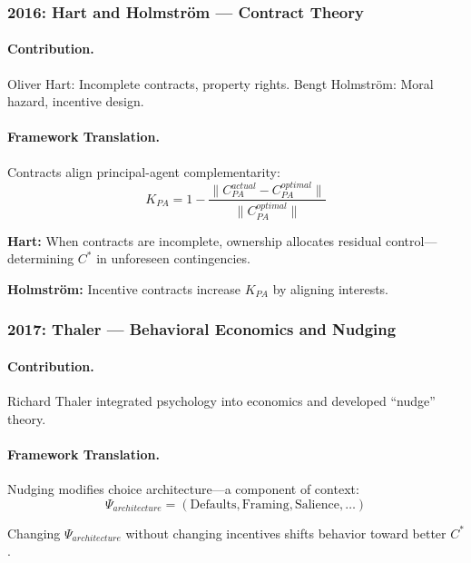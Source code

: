\subsubsection{2016: Hart and Holmström --- Contract Theory}

\paragraph{Contribution.}
Oliver Hart: Incomplete contracts, property rights.
Bengt Holmström: Moral hazard, incentive design.

\paragraph{Framework Translation.}
Contracts align principal-agent complementarity:
\begin{equation}
  K_{PA} = 1 - \frac{\|C_{PA}^{actual} - C_{PA}^{optimal}\|}{\|C_{PA}^{optimal}\|}
\end{equation}

\textbf{Hart:} When contracts are incomplete, ownership allocates residual control---
determining $C^*$ in unforeseen contingencies.

\textbf{Holmström:} Incentive contracts increase $K_{PA}$ by aligning interests.

\subsubsection{2017: Thaler --- Behavioral Economics and Nudging}

\paragraph{Contribution.}
Richard Thaler \citep{thalersunstein2008} integrated psychology into economics and developed ``nudge'' theory.

\paragraph{Framework Translation.}
Nudging modifies choice architecture---a component of context:
\begin{equation}
  \Psi_{architecture} = (\text{Defaults}, \text{Framing}, \text{Salience}, \ldots)
\end{equation}

Changing $\Psi_{architecture}$ without changing incentives shifts behavior toward better $C^*$.

